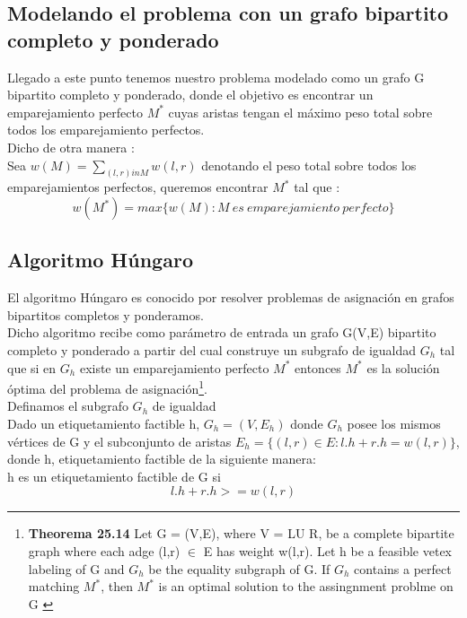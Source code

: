 \documentclass[sn-mathphys,Numbered]{sn-jnl}%
\theoremstyle{thmstyleone}%
\theoremstyle{thmstyletwo}%
\theoremstyle{thmstylethree}%
\begin{document}
\subsection*{Modelando el problema con un grafo bipartito completo y ponderado}
Llegado a este punto tenemos nuestro problema modelado como un grafo G bipartito completo y ponderado, donde el objetivo es encontrar un emparejamiento  perfecto $M^*$ cuyas aristas tengan el máximo peso total sobre todos los emparejamiento perfectos.\\
Dicho de otra manera :\\
Sea $w(M) = \sum_{(l,r) in M} w(l,r)$ denotando el peso total sobre todos los emparejamientos perfectos, queremos encontrar $M^*$ tal que :
\begin{equation}
     w(M^*) = max\{w(M) : M ~es~emparejamiento~perfecto\} 
\end{equation}

\subsection{Algoritmo Húngaro}
El algoritmo Húngaro\cite{1} es conocido por resolver problemas de asignaci\'on en grafos bipartitos completos y ponderamos.\\
Dicho algoritmo recibe como parámetro de entrada un grafo G(V,E) bipartito completo y ponderado a partir del cual construye un subgrafo de igualdad $G_h$ tal que si en $G_h$ existe un emparejamiento perfecto $M^*$ entonces $M^*$ es la solución óptima del problema de asignación\footnote{\textbf{Theorema 25.14} Let G = (V,E), where V = LU R, be a complete bipartite graph where each adge (l,r) $\in$ E has weight w(l,r). Let h be a feasible vetex labeling of G and $G_h$  be the equality subgraph of G. If $G_h$ contains a perfect matching $M^*$, then $M^*$ is an optimal solution to the assingnment problme on G \cite{2}}.\\ 
Definamos el subgrafo $G_h$ de igualdad\\
Dado un etiquetamiento factible h, $G_h = (V,E_h)$ donde $G_h$ posee los mismos v\'ertices de G y el subconjunto de aristas $E_h = \{(l,r) \in E : l.h + r.h = w(l,r)\}$, donde h, etiquetamiento factible de la siguiente manera:\\
h es un etiquetamiento factible de G si $$l.h + r.h >= w(l,r)$$
\end{document}
